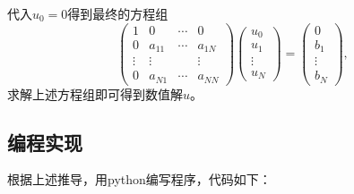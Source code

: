 \documentclass{ctexart}
\begin{document}
代入$u_0=0$得到最终的方程组
$$
\begin{pmatrix}
  1 & 0 & \cdots & 0 \\
  0 & a_{11} & \cdots  & a_{1N}\\
  \vdots & \vdots &  & \vdots\\
  0 & a_{N1} & \cdots & a_{NN}
 \end{pmatrix}
 \begin{pmatrix}
  u_0\\
  u_1\\
  \vdots\\
 u_N
 \end{pmatrix}=
 \begin{pmatrix}
  0\\
  b_1\\
  \vdots\\
 b_N
 \end{pmatrix},
$$
求解上述方程组即可得到数值解$u$。
\subsection{编程实现}
根据上述推导，用python编写程序，代码如下：
\end{document}
